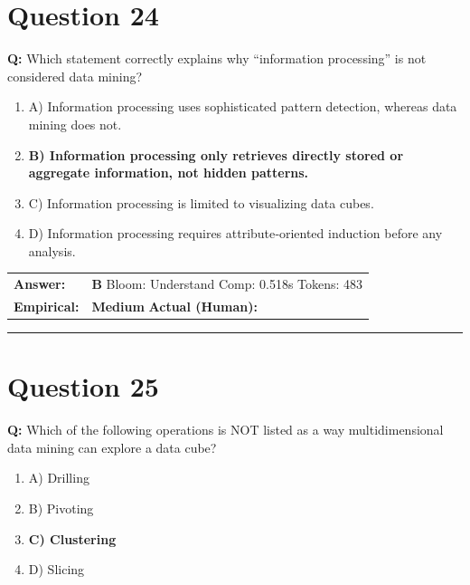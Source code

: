 \documentclass[9pt]{article}
\begin{document}
\section*{Question 24}

\textbf{Q:} Which statement correctly explains why “information processing” is not considered data mining?

\begin{enumerate}[label=\textbf{\alph{*})}, nosep]
    \item A) Information processing uses sophisticated pattern detection, whereas data mining does not.
    \item \textbf{B) Information processing only retrieves directly stored or aggregate information, not hidden patterns.} %
    \item C) Information processing is limited to visualizing data cubes.
    \item D) Information processing requires attribute‑oriented induction before any analysis.

\end{enumerate}

\begin{tabular}{@{}l p{10.5cm}@{}}
\textbf{Answer:} & \textbf{B} \hspace{1em} Bloom: Understand \hspace{1em} Comp: 0.518s \hspace{1em} Tokens: 483 \\
\textbf{Empirical:} & \textbf{Medium} \hspace{1em} \textbf{Actual (Human):} \underline{\hspace{5cm}}
\end{tabular}

\vspace{0.2cm}
\rule{\textwidth}{0.4pt}
\vspace{0.2cm}


\section*{Question 25}

\textbf{Q:} Which of the following operations is NOT listed as a way multidimensional data mining can explore a data cube?

\begin{enumerate}[label=\textbf{\alph{*})}, nosep]
    \item A) Drilling
    \item B) Pivoting
    \item \textbf{C) Clustering} %
    \item D) Slicing

\end{enumerate}
\end{document}
